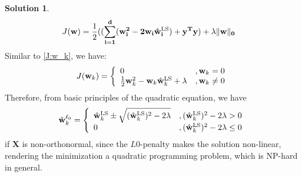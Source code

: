 \documentclass[a4paper,UTF8]{article}
\numberwithin{equation}{section}
\theoremstyle{definition}
\newtheorem*{solution}{Solution}
\begin{document}
\begin{solution}
\begin{equation}
\begin{split}
J(\mathbf{w})   &=  \frac{1}{2} (\mathbf{(\sum_{i=1}^{d} (w_i^2 - 2w_i \hat{\mathbf{w}}^{{\small \text{LS}}}_i) + y^Ty)	 + \lambda  \| \mathbf{w}\|_0  } 
\end{split}
\end{equation}
Similar to \eqref{J:w_k}, we have: 
\begin{equation} 
J(\mathbf{w}_k) = \left\{ \begin{array}{ll}
0  & ,\mathbf{w}_k = 0 \\
\frac{1}{2}  \mathbf{w}_k^2 - \mathbf{w}_k \hat{\mathbf{w}}^{{\small \text{LS}}}_k +  \lambda  &,\mathbf{w}_k \neq 0
 \end{array} \right.
\end{equation}
Therefore, from basic principles of the quadratic equation, we have
\begin{equation}
\hat{\mathbf{w}}^{\ell_0}_k = \left\{ \begin{array}{ll}
\hat{\mathbf{w}}^{{\small \text{LS}}}_k \pm \sqrt{(\hat{\mathbf{w}}^{{\small \text{LS}}}_k)^2 - 2\lambda} &,  (\hat{\mathbf{w}}^{{\small \text{LS}}}_k)^2  - 2\lambda > 0 \\
0  								&,  (\hat{\mathbf{w}}^{{\small \text{LS}}}_k)^2  - 2\lambda \leq 0
  \end{array} \right.
\end{equation}
if $\mathbf{X}$  is non-orthonormal,  since the $L0$-penalty makes the solution non-linear,  rendering the minimization a  quadratic programming problem, which is NP-hard in general. \footnotemark    \footnotemark 
~\\
~\\
\end{solution}

\end{document}
